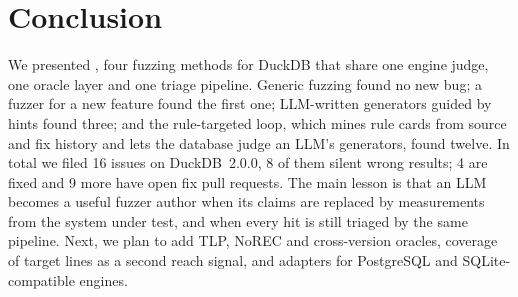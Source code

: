 \section{Conclusion}
\label{sec:conclusion}

We presented \tool, four fuzzing methods for DuckDB that share one engine judge, one oracle layer and one triage
pipeline. Generic fuzzing found no new bug; a fuzzer for a new feature found the first one; LLM-written generators guided
by hints found three; and the rule-targeted loop, which mines rule cards from source and fix history and lets the
database judge an LLM's generators, found twelve. In total we filed 16 issues on DuckDB~2.0.0, 8 of them silent wrong
results; 4 are fixed and 9 more have open fix pull requests. The main lesson is that an LLM becomes a useful fuzzer
author when its claims are replaced by measurements from the system under test, and when every hit is still triaged by
the same pipeline. Next, we plan to add TLP, NoREC and cross-version oracles, coverage of target lines as a second reach
signal, and adapters for PostgreSQL and SQLite-compatible engines.
